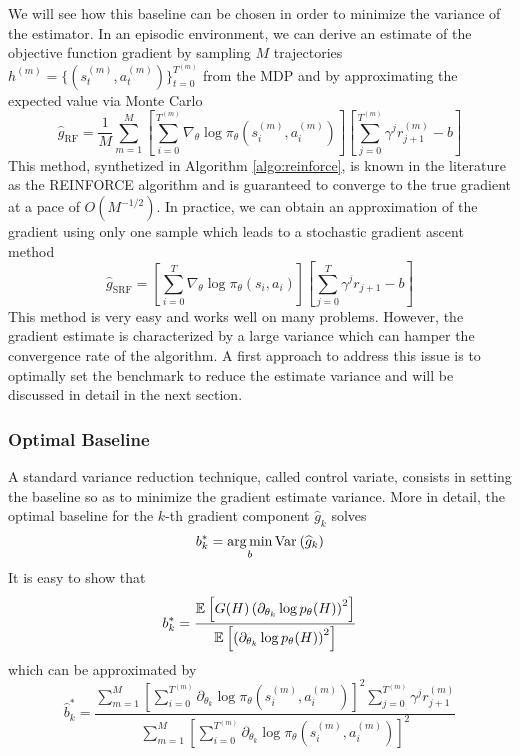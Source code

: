 We will see how this baseline can be chosen in order to minimize the variance
of the estimator. In an episodic environment, we can derive an estimate of the 
objective function gradient by sampling $M$ trajectories $h^{(m)} = \{(s_t^{(m)},
a_t^{(m)})\}_{t = 0}^{T^{(m)}}$ from the MDP and by approximating the expected 
value via Monte Carlo
\begin{equation}
\label{eq:reinforce_gradient}
	\widehat{g}_{\text{RF}} = \frac{1}{M} \sum^{M}_{m=1} \left[ \sum_{i=0}^{T^{(m)}} 
	\nabla_\theta \log \pi_\theta(s_i^{(m)}, a_i^{(m)}) \right] \left[
	\sum^{T^{(m)}}_{j=0} \gamma^j r_{j+1}^{(m)} - b \right]  
\end{equation}
This method, synthetized in Algorithm \ref{algo:reinforce}, is known in the literature as the REINFORCE algorithm and is guaranteed to converge to the true gradient at a pace of $O(M^{-1/2})$. In practice, we can obtain an approximation of the gradient using only one sample which leads to a stochastic gradient ascent method
\begin{equation}
	\widehat{g}_{\text{SRF}} = \left[ \sum_{i=0}^{T} \nabla_\theta \log \pi_\theta(s_i, 
	a_i) \right] \left[ \sum^{T}_{j=0} \gamma^j r_{j+1} - b \right]  
\end{equation}
This method is very easy and works well on many problems. However, the gradient
estimate is characterized by a large variance which can hamper the convergence
rate of the algorithm. A first approach to address this issue is to optimally
set the benchmark to reduce the estimate variance and will be discussed in detail in the next section.



\subsubsection{Optimal Baseline}
A standard variance reduction technique, called control variate, consists in setting the baseline so as to minimize the gradient estimate variance. More in detail, the optimal baseline for the $k$-th gradient component $\widehat{g}_{k}$ solves
\begin{equation}
	b_k^* = \operatorname*{arg\,min}_b \text{Var}_{}\left( \widehat{g}_{k} \right)
\end{equation} 
It is easy to show that 
\begin{equation}
	b_k^* = \frac{\mathbb{E}_{}\left[ G(H) \left(\partial_{\theta_k} \log p_\theta(H)\right)^2   \right]}{\mathbb{E}_{}\left[ \left(\partial_{\theta_k} \log p_\theta(H)\right)^2 \right]}
\end{equation}
which can be approximated by 
\begin{equation}
	\label{eq:optimal_baseline}
	\widehat{b}_k^* = \frac{\sum^{M}_{m=1} \left[ \sum_{i=0}^{T^{(m)}} 
		\partial_{\theta_k} \log \pi_\theta\left(s_i^{(m)}, a_i^{(m)}\right) \right]^2 
		\sum^{T^{(m)}}_{j=0} \gamma^j r_{j+1}^{(m)}}{\sum^{M}_{m=1} \left[ \sum_{i=0}^{T^{(m)}} \partial_{\theta_k} \log \pi_\theta\left(s_i^{(m)}, a_i^{(m)}\right) \right]^2}
\end{equation}

